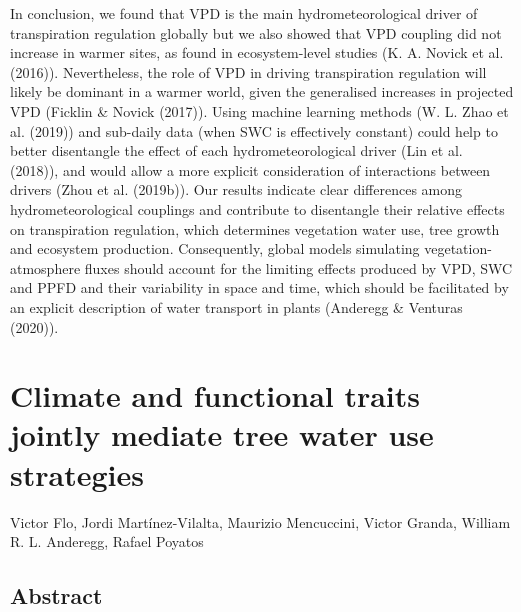 \documentclass[11pt,twoside]{reedthesis}
\begin{document}
In conclusion, we found that VPD is the main hydrometeorological driver
of transpiration regulation globally but we also showed that VPD
coupling did not increase in warmer sites, as found in ecosystem-level
studies (K. A. Novick et al. (2016)). Nevertheless, the role of VPD in
driving transpiration regulation will likely be dominant in a warmer
world, given the generalised increases in projected VPD (Ficklin \&
Novick (2017)). Using machine learning methods (W. L. Zhao et al.
(2019)) and sub-daily data (when SWC is effectively constant) could help
to better disentangle the effect of each hydrometeorological driver (Lin
et al. (2018)), and would allow a more explicit consideration of
interactions between drivers (Zhou et al. (2019b)). Our results indicate
clear differences among hydrometeorological couplings and contribute to
disentangle their relative effects on transpiration regulation, which
determines vegetation water use, tree growth and ecosystem production.
Consequently, global models simulating vegetation-atmosphere fluxes
should account for the limiting effects produced by VPD, SWC and PPFD
and their variability in space and time, which should be facilitated by
an explicit description of water transport in plants (Anderegg \&
Venturas (2020)).\par

\newpage

\chapter[Climate and functional traits jointly mediate tree water use strategies]{Climate and functional traits jointly mediate tree water use strategies}

\setlength{\parindent}{0pt} Victor Flo, Jordi Martínez-Vilalta, Maurizio
Mencuccini, Victor Granda, William R. L. Anderegg, Rafael Poyatos

\newpage

\setlength{\parindent}{30pt}

\section*{Abstract}
\end{document}
